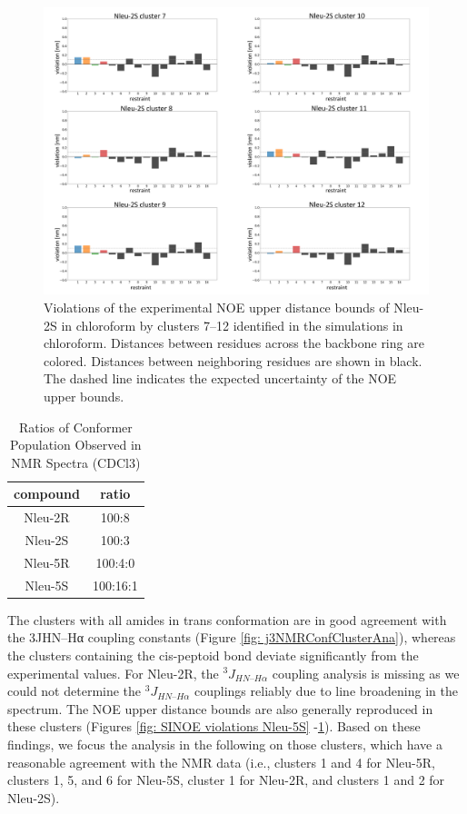 \begin{figure}
    \centering
    \includegraphics[width=\textwidth]{7_chapter_5/fig/results/NMR_2Sb.png}
    \caption{Violations  of  the  experimental  NOE  upper  distance  bounds  of  Nleu-2S  in chloroform by clusters 7–12 identified in the simulations in chloroform. Distances             between residues across the backbone ring are colored. Distances between neighboring residues are shown in black. The dashed line indicates the expected uncertainty of          the NOE upper bounds.}
    \label{fig: SINOE violations Nleu-2SII}
\end{figure}


\begin{table}[]
    \centering
    \begin{tabular}{c|c}
    compound & ratio \\
    \hline
    Nleu-2R &	100:8 \\
    Nleu-2S &   100:3 \\
    Nleu-5R &   100:4:0 \\
    Nleu-5S &	100:16:1 \\
    \end{tabular}
    \caption{Ratios of Conformer Population Observed in NMR Spectra (CDCl3)}
    \label{tab: nmrConfRatios}
\end{table}


The clusters with all amides in trans conformation are in good agreement with the 3JHN–Hα coupling constants (Figure \ref{fig: j3NMRConfClusterAna}), whereas the clusters containing the cis-peptoid bond deviate significantly from the experimental values. For Nleu-2R, the $^3J_{HN–H\alpha}$ coupling analysis is missing as we could not determine the $^3J_{HN–H\alpha}$ couplings reliably due to line broadening in the spectrum. The NOE upper distance bounds are also generally reproduced in these clusters (Figures \ref{fig: SINOE violations Nleu-5S} -\ref{fig: SINOE violations Nleu-2SII}). Based on these findings, we focus the analysis in the following on those clusters, which have a reasonable agreement with the NMR data (i.e., clusters 1 and 4 for Nleu-5R, clusters 1, 5, and 6 for Nleu-5S, cluster 1 for Nleu-2R, and clusters 1 and 2 for Nleu-2S).

